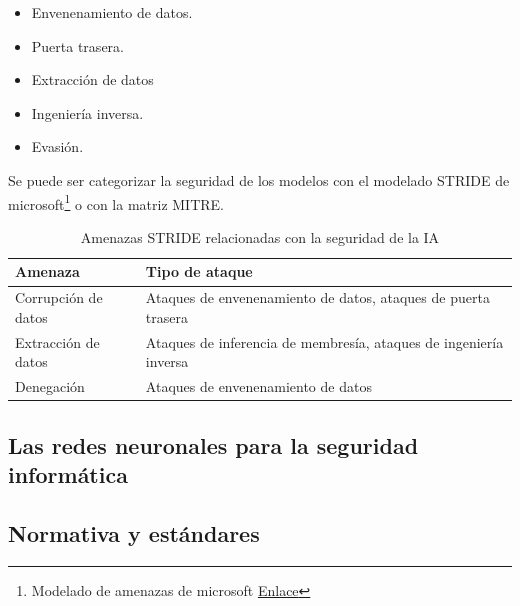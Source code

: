 \begin{itemize}
    \item Envenenamiento de datos.
    \item Puerta trasera.
    \item Extracción de datos
    \item Ingeniería inversa.
    \item Evasión.
\end{itemize}

Se puede ser categorizar la seguridad de los modelos con el modelado \gls{STRIDE} de microsoft\footnote{Modelado de amenazas de microsoft \href{https://learn.microsoft.com/es-es/azure/security/develop/threat-modeling-tool-threats}{Enlace}} o con la matriz \gls{MITRE}.

\begin{table}[H]
    \centering
    \small
    \begin{tabularx}{\textwidth}{|l|X|}
        \hline
        \textbf{Amenaza}    & \textbf{Tipo de ataque}                                           \\
        \hline
        Corrupción de datos & Ataques de envenenamiento de datos, ataques de puerta trasera     \\
        Extracción de datos & Ataques de inferencia de membresía, ataques de ingeniería inversa \\
        Denegación          & Ataques de envenenamiento de datos                                \\
        \hline
    \end{tabularx}
    \caption{Amenazas STRIDE relacionadas con la seguridad de la IA}
    \label{tab:amenazas}
\end{table}


\subsection{Las redes neuronales para la seguridad informática}






\subsection{Normativa y estándares}

